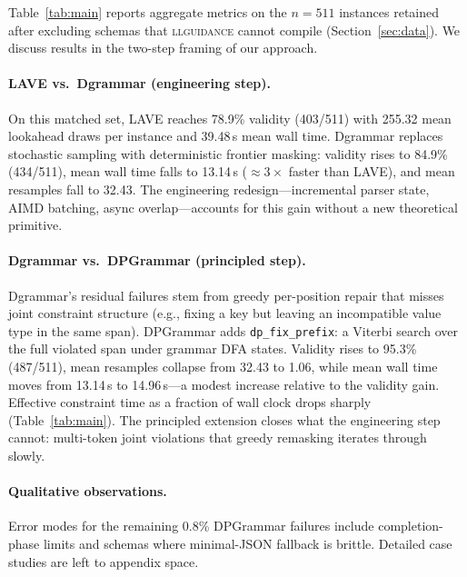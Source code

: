 Table~\ref{tab:main} reports aggregate metrics on the $n{=}511$ instances retained after excluding schemas that \textsc{llguidance} cannot compile (Section~\ref{sec:data}). We discuss results in the two-step framing of our approach.

\paragraph{LAVE vs.\ Dgrammar (engineering step).}
On this matched set, LAVE reaches 78.9\% validity (403/511) with 255.32 mean lookahead draws per instance and 39.48\,s mean wall time. Dgrammar replaces stochastic sampling with deterministic frontier masking: validity rises to 84.9\% (434/511), mean wall time falls to 13.14\,s ($\approx\!3\times$ faster than LAVE), and mean resamples fall to 32.43. The engineering redesign—incremental parser state, AIMD batching, async overlap—accounts for this gain without a new theoretical primitive.

\paragraph{Dgrammar vs.\ DPGrammar (principled step).}
Dgrammar's residual failures stem from greedy per-position repair that misses joint constraint structure (e.g., fixing a key but leaving an incompatible value type in the same span). DPGrammar adds \texttt{dp\_fix\_prefix}: a Viterbi search over the full violated span under grammar DFA states. Validity rises to 95.3\% (487/511), mean resamples collapse from 32.43 to 1.06, while mean wall time moves from 13.14\,s to 14.96\,s—a modest increase relative to the validity gain. Effective constraint time as a fraction of wall clock drops sharply (Table~\ref{tab:main}). The principled extension closes what the engineering step cannot: multi-token joint violations that greedy remasking iterates through slowly.

\paragraph{Qualitative observations.}
Error modes for the remaining 0.8\% DPGrammar failures include completion-phase limits and schemas where minimal-JSON fallback is brittle. Detailed case studies are left to appendix space.

